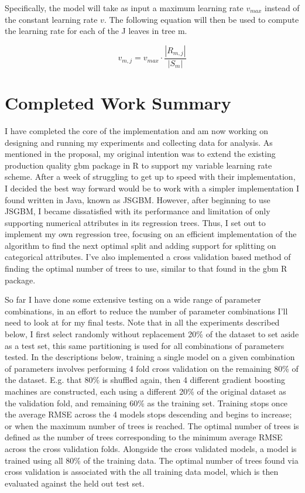\documentclass[runningheads]{llncs_2}
\begin{document}
Specifically, the model will take as input a maximum learning rate \(v_{max}\) instead of the constant learning rate \(v\). The following equation will then be used to compute the learning rate for each of the J leaves in tree m.

\begin{equation}
	v_{m,j} = v_{max}  \cdot  \frac{|R_{m,j}|}{|S_m|}
	\label{eq:adaptRule1}
\end{equation}

\section{Completed Work Summary}

I have completed the core of the implementation and am now working on designing and running my experiments and collecting data for analysis. As mentioned in the proposal, my original intention was to extend the existing production quality gbm package in R to support my variable learning rate scheme. After a week of struggling to get up to speed with their implementation, I decided the best way forward would be to work with a simpler implementation I found written in Java, known as JSGBM. However, after beginning to use JSGBM, I became dissatisfied with its performance and limitation of only supporting numerical attributes in its regression trees. Thus, I set out to implement my own regression tree, focusing on an efficient implementation of the algorithm to find the next optimal split and adding support for splitting on categorical attributes. I've also implemented a cross validation based method of finding the optimal number of trees to use, similar to that found in the gbm R package. 

So far I have done some extensive testing on a wide range of parameter combinations, in an effort to reduce the number of parameter combinations I'll need to look at for my final tests.  Note that in all the experiments described below, I first select randomly without replacement 20\% of the dataset to set aside as a test set, this same partitioning is used for all combinations of parameters tested. In the descriptions below, training a single model on a given combination of parameters involves performing 4 fold cross validation on the remaining 80\% of the dataset. E.g. that 80\% is shuffled again, then 4 different gradient boosting machines are constructed, each using a different 20\% of the original dataset as the validation fold, and remaining 60\% as the training set. Training stops once the average RMSE across the 4 models stops descending and begins to increase; or when the maximum number of trees is reached. The optimal number of trees is defined as the number of trees corresponding to the minimum average RMSE across the cross validation folds. Alongside the cross validated models, a model is trained using all 80\% of the training data. The optimal number of trees found via cross validation is associated with the all training data model, which is then evaluated against the held out test set.
\end{document}
